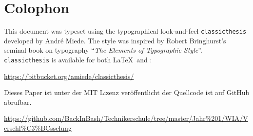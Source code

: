 
\pagestyle{empty}

\hfill

\vfill


\section*{Colophon}

This document was typeset using the typographical look-and-feel \texttt{classicthesis} developed by Andr\'e Miede. The style was inspired by Robert Bringhurst's seminal book on typography ``\emph{The Elements of Typographic Style}''. \texttt{classicthesis} is available for both \LaTeX\ and \mLyX: 

\begin{center}
\url{https://bitbucket.org/amiede/classicthesis/}
\end{center}

\noindent Dieses Paper ist unter der MIT Lizenz veröffentlicht der Quellcode ist auf GitHub abrufbar.

\begin{center}
\url{https://github.com/BackInBash/Technikerschule/tree/master/Jahr%201/WIA/Verschl%C3%BCsselung}
\end{center}
 
\bigskip

\noindent\finalVersionString